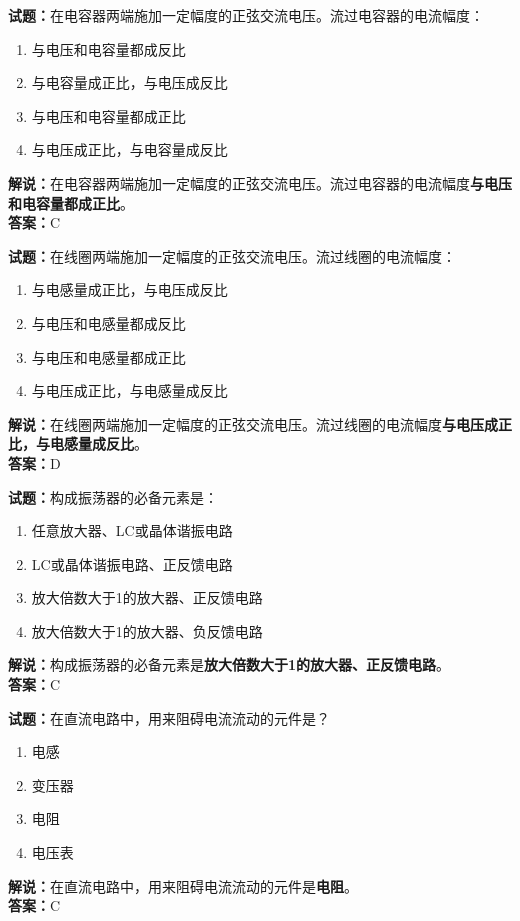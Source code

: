 \documentclass{ctexbook}
\begin{document}
\bigskip


\noindent\textbf{试题：}在电容器两端施加一定幅度的正弦交流电压。流过电容器的电流幅度：
\begin{enumerate}[leftmargin=3em]
\item 与电压和电容量都成反比
\item 与电容量成正比，与电压成反比
\item 与电压和电容量都成正比
\item 与电压成正比，与电容量成反比
\end{enumerate}
\noindent\textbf{解说：}在电容器两端施加一定幅度的正弦交流电压。流过电容器的电流幅度\textbf{与电压和电容量都成正比}。\\\noindent\textbf{答案：}C


\bigskip


\noindent\textbf{试题：}在线圈两端施加一定幅度的正弦交流电压。流过线圈的电流幅度：
\begin{enumerate}[leftmargin=3em]
\item 与电感量成正比，与电压成反比
\item 与电压和电感量都成反比
\item 与电压和电感量都成正比
\item 与电压成正比，与电感量成反比
\end{enumerate}
\noindent\textbf{解说：}在线圈两端施加一定幅度的正弦交流电压。流过线圈的电流幅度\textbf{与电压成正比，与电感量成反比}。\\\noindent\textbf{答案：}D

\bigskip


\noindent\textbf{试题：}构成振荡器的必备元素是：
\begin{enumerate}[leftmargin=3em]
\item 任意放大器、LC或晶体谐振电路
\item LC或晶体谐振电路、正反馈电路
\item 放大倍数大于1的放大器、正反馈电路
\item 放大倍数大于1的放大器、负反馈电路
\end{enumerate}
\noindent\textbf{解说：}构成振荡器的必备元素是\textbf{放大倍数大于1的放大器、正反馈电路}。\\\noindent\textbf{答案：}C

\bigskip


\noindent\textbf{试题：}在直流电路中，用来阻碍电流流动的元件是？
\begin{enumerate}[leftmargin=3em]
\item 电感
\item 变压器
\item 电阻
\item 电压表
\end{enumerate}
\noindent\textbf{解说：}在直流电路中，用来阻碍电流流动的元件是\textbf{电阻}。\\\noindent\textbf{答案：}C
\end{document}
